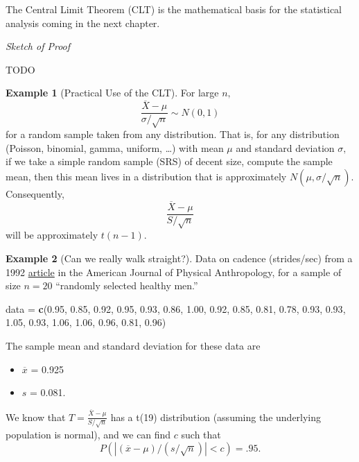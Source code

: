 \documentclass[
]{book}
\newenvironment{Shaded}{\begin{snugshade}}{\end{snugshade}}
\newcommand{\FloatTok}[1]{\textcolor[rgb]{0.00,0.00,0.81}{#1}}
\newcommand{\FunctionTok}[1]{\textcolor[rgb]{0.13,0.29,0.53}{\textbf{#1}}}
\newcommand{\NormalTok}[1]{#1}
\newcommand{\OtherTok}[1]{\textcolor[rgb]{0.56,0.35,0.01}{#1}}
\providecommand{\tightlist}{%
  \setlength{\itemsep}{0pt}\setlength{\parskip}{0pt}}
\theoremstyle{definition}
\theoremstyle{definition}
\newtheorem{example}{Example}[chapter]
\theoremstyle{definition}
\theoremstyle{definition}
\theoremstyle{remark}
\begin{document}
The Central Limit Theorem (CLT) is the mathematical basis for the statistical analysis coming in the next chapter.

\emph{Sketch of Proof}

TODO

\begin{example}[Practical Use of the CLT]
\protect\hypertarget{exm:clt-use}{}\label{exm:clt-use}For large \(n,\) \[\frac{\overline{X}-\mu}{\sigma/\sqrt{n}} \sim N(0,1)\] for a random sample taken from any distribution.
That is, for any distribution (Poisson, binomial, gamma, uniform, \ldots) with mean \(\mu\) and standard deviation \(\sigma,\) if we take a simple random sample (SRS) of decent size, compute the sample mean, then this mean lives in a distribution that is approximately \(N(\mu,\sigma/\sqrt{n})\). Consequently, \[\frac{\overline{X}-\mu}{S/\sqrt{n}}\] will be approximately \(t(n-1)\).
\end{example}

\begin{example}[Can we really walk straight?]
\protect\hypertarget{exm:walk-straight}{}\label{exm:walk-straight}Data on cadence (strides/sec) from a 1992 \href{https://onlinelibrary.wiley.com/doi/10.1002/ajpa.1330890104}{article} in the American Journal of Physical Anthropology, for a sample of size \(n = 20\) ``randomly selected healthy men.''

\begin{Shaded}
\begin{Highlighting}[]
\NormalTok{data }\OtherTok{=} \FunctionTok{c}\NormalTok{(}\FloatTok{0.95}\NormalTok{, }\FloatTok{0.85}\NormalTok{, }\FloatTok{0.92}\NormalTok{, }\FloatTok{0.95}\NormalTok{, }\FloatTok{0.93}\NormalTok{, }\FloatTok{0.86}\NormalTok{, }\FloatTok{1.00}\NormalTok{, }\FloatTok{0.92}\NormalTok{, }\FloatTok{0.85}\NormalTok{, }\FloatTok{0.81}\NormalTok{,}
\FloatTok{0.78}\NormalTok{, }\FloatTok{0.93}\NormalTok{, }\FloatTok{0.93}\NormalTok{, }\FloatTok{1.05}\NormalTok{, }\FloatTok{0.93}\NormalTok{, }\FloatTok{1.06}\NormalTok{, }\FloatTok{1.06}\NormalTok{, }\FloatTok{0.96}\NormalTok{, }\FloatTok{0.81}\NormalTok{, }\FloatTok{0.96}\NormalTok{)}
\end{Highlighting}
\end{Shaded}

The sample mean and standard deviation for these data are

\begin{itemize}
\tightlist
\item
  \(\overline{x}\) = 0.925
\item
  \(s\) = 0.081.
\end{itemize}

We know that \(T = \frac{\overline{X}-\mu}{S/\sqrt{n}}\) has a t(19) distribution (assuming the underlying population is normal), and we can find \(c\) such that \[P(|(\overline{x}-\mu)/(s/\sqrt{n})| < c) = .95.\]
\end{example}
\end{document}
